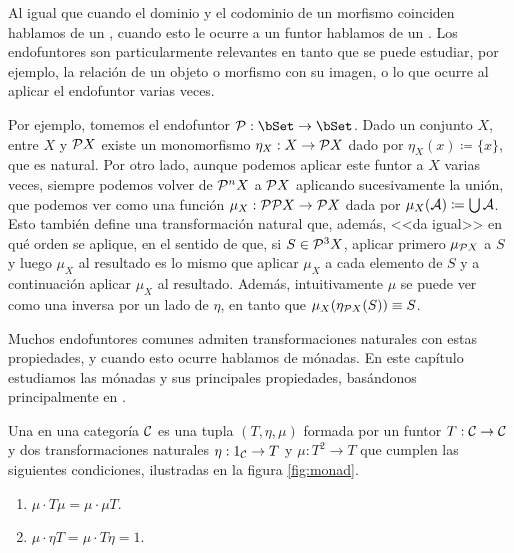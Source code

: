 Al igual que cuando el dominio y el codominio de un morfismo coinciden hablamos
de un , cuando esto le ocurre a un funtor hablamos de un
. Los endofuntores son particularmente relevantes en tanto que
se puede estudiar, por ejemplo, la relación de un objeto o morfismo con su
imagen, o lo que ocurre al aplicar el endofuntor varias veces.

Por ejemplo, tomemos el endofuntor $\power:\bSet\to\bSet$. Dado un conjunto $X$,
entre $X$ y $\mathcal{P} X$ existe un monomorfismo $\eta_X:X\to\mathcal{P} X$ dado por
$\eta_X(x)\coloneqq\{x\}$, que es natural. Por otro lado, aunque podemos aplicar
este funtor a $X$ varias veces, siempre podemos volver de $\mathcal{P}^nX$ a
$\mathcal{P} X$ aplicando sucesivamente la unión, que podemos ver como una función
$\mu_X:\mathcal{P}\mathcal{P} X\to\mathcal{P} X$ dada por $\mu_X(\mathcal{A})\coloneqq\bigcup\mathcal{A}$. Esto
también define una transformación natural que, además, <<da igual>> en qué orden
se aplique, en el sentido de que, si $S\in\mathcal{P}^3X$, aplicar primero
$\mu_{\mathcal{P} X}$ a $S$ y luego $\mu_X$ al resultado es lo mismo que aplicar
$\mu_X$ a cada elemento de $S$ y a continuación aplicar $\mu_X$ al resultado.
Además, intuitivamente $\mu$ se puede ver como una inversa por un lado de
$\eta$, en tanto que $\mu_X(\eta_{\mathcal{P} X}(S))\equiv S$.

Muchos endofuntores comunes admiten transformaciones naturales con estas
propiedades, y cuando esto ocurre hablamos de mónadas. En este capítulo
estudiamos las mónadas y sus principales propiedades, basándonos principalmente
en \cite[VI]{maclane}.

\begin{definition}
  Una  en una categoría $\mathcal{C}$ es una tupla $(T,\eta,\mu)$
  formada por un funtor $T:\mathcal{C}\to\mathcal{C}$ y dos transformaciones naturales
  $\eta:1_{\mathcal{C}}\to T$ y $\mu:T^2\to T$ que cumplen las siguientes
  condiciones, ilustradas en la figura \ref{fig:monad}.
  \begin{enumerate}
  \item $\mu\cdot T\mu = \mu\cdot\mu T$.
  \item $\mu\cdot\eta T = \mu\cdot T\eta = 1$.
  \end{enumerate}
\end{definition}


